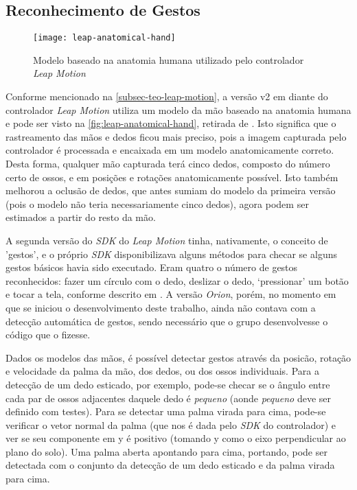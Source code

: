 \subsection{Reconhecimento de Gestos}\label{subsubsec-teo-gestos}

\begin{figure}[h]
	\centering
	\caption{Modelo baseado na anatomia humana utilizado pelo controlador \textit{Leap Motion}}
	\texttt{[image: leap-anatomical-hand]}
	\label{fig:leap-anatomical-hand}
\end{figure}

Conforme mencionado na \autoref{subsec-teo-leap-motion}, a versão 
v2 em diante do controlador \textit{Leap Motion} utiliza um modelo 
da mão baseado na anatomia humana e pode ser visto 
na \autoref{fig:leap-anatomical-hand}, retirada de \cite{leap:2016:intro-skeletal}. Isto significa que o 
rastreamento das mãos e dedos ficou mais preciso, pois a 
imagem capturada pelo controlador é processada e encaixada em 
um modelo anatomicamente correto. Desta forma, qualquer mão 
capturada terá cinco dedos, composto do número certo de ossos, e 
em posições e rotações anatomicamente possível. Isto também 
melhorou a oclusão de dedos, que antes sumiam do modelo da 
primeira versão (pois o modelo não teria necessariamente cinco dedos), 
agora podem ser estimados a partir do resto da mão.

A segunda versão do \textit{SDK} do \textit{Leap Motion} 
tinha, nativamente, o conceito de 'gestos', e o próprio 
\textit{SDK} disponibilizava alguns métodos para checar 
se alguns gestos básicos havia sido executado. Eram quatro 
o número de gestos reconhecidos: fazer um círculo com o 
dedo, deslizar o dedo, `pressionar' um botão e tocar a 
tela, conforme descrito em \cite{leap:2016:gestures}. A 
versão \textit{Orion}, porém, no momento em que se 
iniciou o desenvolvimento deste trabalho, ainda não 
contava com a detecção automática de gestos, sendo 
necessário que o grupo desenvolvesse o código que o fizesse.

Dados os modelos das mãos, é possível detectar gestos através 
da posicão, rotação e velocidade da palma da mão, dos dedos, 
ou dos ossos individuais. Para a detecção de um dedo 
esticado, por exemplo, pode-se checar se o ângulo entre 
cada par de ossos adjacentes daquele dedo é \textit{pequeno} 
(aonde \textit{pequeno} deve ser definido com testes). 
Para se detectar uma palma virada para cima, pode-se 
verificar o vetor normal da palma (que nos é dada pelo 
\textit{SDK} do controlador) e ver se seu componente em 
y é positivo (tomando y como o eixo perpendicular ao 
plano do solo). Uma palma aberta apontando para cima, 
portando, pode ser detectada com o conjunto da detecção 
de um dedo esticado e da palma virada para cima.

